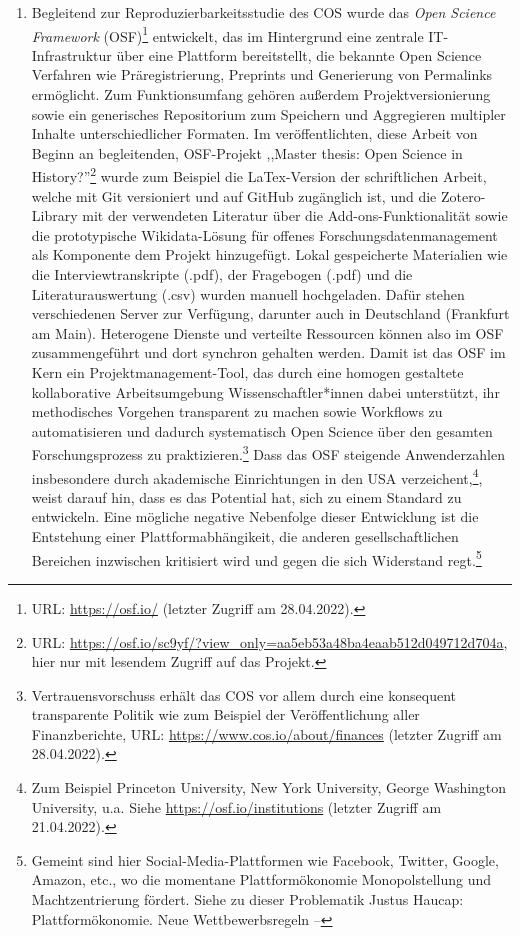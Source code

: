 \begin{enumerate}
\item Begleitend zur Reproduzierbarkeitsstudie des COS wurde das \textit{Open Science Framework} (OSF)\footnote{URL: \url{https://osf.io/} (letzter Zugriff am 28.04.2022).} entwickelt, das im Hintergrund eine zentrale IT- Infrastruktur über eine Plattform bereitstellt, die bekannte Open Science Verfahren wie Präregistrierung, Preprints und Generierung von Permalinks ermöglicht. Zum Funktionsumfang gehören außerdem Projektversionierung sowie ein generisches Repositorium zum Speichern und Aggregieren multipler Inhalte unterschiedlicher Formaten. Im veröffentlichten, diese Arbeit von Beginn an begleitenden, OSF-Projekt ,,Master thesis: Open Science in History?''\footnote{URL: \url{https://osf.io/sc9yf/?view_only=aa5eb53a48ba4eaab512d049712d704a}, hier nur mit lesendem Zugriff auf das Projekt.} wurde zum Beispiel die LaTex-Version der schriftlichen Arbeit, welche mit Git versioniert und auf GitHub zugänglich ist, und die Zotero-Library mit der verwendeten Literatur über die Add-ons-Funktionalität sowie die prototypische Wikidata-Lösung für offenes Forschungsdatenmanagement als Komponente dem Projekt hinzugefügt. Lokal gespeicherte Materialien wie die Interviewtranskripte (.pdf), der Fragebogen (.pdf) und die Literaturauswertung (.csv) wurden manuell hochgeladen. Dafür stehen verschiedenen Server zur Verfügung, darunter auch in Deutschland (Frankfurt am Main). Heterogene Dienste und verteilte Ressourcen können also im OSF zusammengeführt und dort synchron gehalten werden. Damit ist das OSF im Kern ein Projektmanagement-Tool, das durch eine homogen gestaltete kollaborative Arbeitsumgebung Wissenschaftler*innen dabei unterstützt, ihr methodisches Vorgehen transparent zu machen sowie Workflows zu automatisieren und dadurch systematisch Open Science über den gesamten Forschungsprozess zu praktizieren.\footnote{Vertrauensvorschuss erhält das COS vor allem durch eine konsequent transparente Politik wie zum Beispiel der Veröffentlichung aller Finanzberichte, URL: \url{https://www.cos.io/about/finances} (letzter Zugriff am 28.04.2022).} Dass das OSF steigende Anwenderzahlen insbesondere durch akademische Einrichtungen in den USA verzeichent,\footnote{Zum Beispiel Princeton University, New York University, George Washington University, u.a. Siehe \url{https://osf.io/institutions} (letzter Zugriff am 21.04.2022).}, weist darauf hin, dass es das Potential hat, sich zu einem Standard zu entwickeln. Eine mögliche negative Nebenfolge dieser Entwicklung ist die Entstehung einer Plattformabhängikeit, die anderen gesellschaftlichen Bereichen inzwischen kritisiert wird und gegen die sich Widerstand regt.\footnote{Gemeint sind hier Social-Media-Plattformen wie Facebook, Twitter, Google, Amazon, etc., wo die momentane Plattformökonomie Monopolstellung und Machtzentrierung fördert. Siehe zu dieser Problematik Justus Haucap: Plattformökonomie. Neue Wettbewerbsregeln –
}
\end{enumerate}
